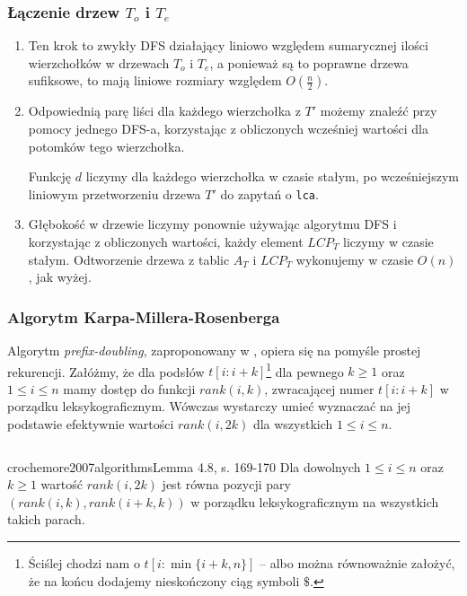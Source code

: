 \subsubsection{Łączenie drzew $T_o$ i $T_e$}
\begin{enumerate}
\item Ten krok to zwykły DFS działający liniowo względem sumarycznej ilości wierzchołków w drzewach $T_o$ i $T_e$, a ponieważ są to poprawne drzewa sufiksowe, to mają liniowe rozmiary względem $O(\frac{n}{2})$.
\item Odpowiednią parę liści dla każdego wierzchołka z $T'$ możemy znaleźć przy pomocy jednego DFS-a, korzystając z obliczonych wcześniej wartości dla potomków tego wierzchołka.

Funkcję $d$ liczymy dla każdego wierzchołka w czasie stałym, po wcześniejszym liniowym przetworzeniu drzewa $T'$ do zapytań o \verb|lca|.
\item Głębokość w drzewie liczymy ponownie używając algorytmu DFS i korzystając z obliczonych wartości, każdy element $LCP_T$ liczymy w czasie stałym. Odtworzenie drzewa z tablic $A_T$ i $LCP_T$ wykonujemy w czasie $O(n)$, jak wyżej.
\end{enumerate}

\subsubsection{Algorytm Karpa-Millera-Rosenberga}

Algorytm \emph{prefix-doubling}, zaproponowany w \citep{karp1972rapid}, opiera się na pomyśle prostej rekurencji. Załóżmy, że dla podsłów $t[i:i + k]$\footnote{Ściślej chodzi nam o $t[i:\min \{i + k, n\}]$ -- albo można równoważnie założyć, że na końcu dodajemy nieskończony ciąg symboli $\$$.} dla pewnego $k \ge 1$ oraz $1 \le i \le n$ mamy dostęp do funkcji $rank(i, k)$, zwracającej numer $t[i:i + k]$ w porządku leksykograficznym.
Wówczas wystarczy umieć wyznaczać na jej podstawie efektywnie wartości $rank(i, 2k)$ dla wszystkich $1 \le i \le n$.

\begin{code}
\inputminted{python}{code/suffix-array/kmr.py}
\label{alg:suffix-array-kmr}
\end{code}

\begin{lemma}{crochemore2007algorithms}{Lemma 4.8, s. 169-170}
  Dla dowolnych $1 \le i \le n$ oraz $k \ge 1$ wartość $rank(i, 2k)$ jest równa pozycji pary $(rank(i, k), rank(i + k, k))$ w porządku leksykograficznym na wszystkich takich parach.
\end{lemma}

